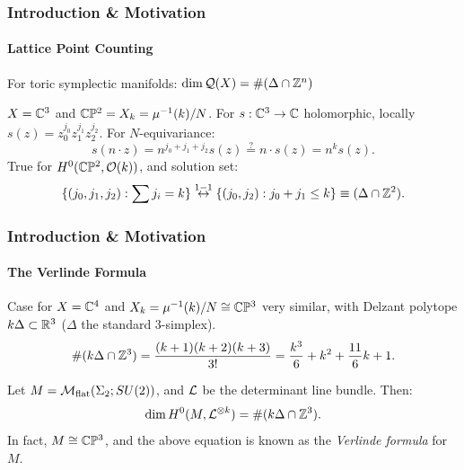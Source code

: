 \begin{frame}
	\frametitle{Introduction \& Motivation}
	\framesubtitle{Lattice Point Counting}
	
	\begin{thm}
	For toric symplectic manifolds:
	$
		\dim \mathcal{Q}(X) = \#(\Delta \cap \mathbb{Z}^{n})
	$
	\end{thm}

	\begin{ex}
		$X = \mathbb{C}^{3}$ and $\mathbb{C}\mathbb{P}^{2} = X_{k} = \mu^{-1}(k)/N$. For $s:\mathbb{C}^{3} \rightarrow \mathbb{C}$ holomorphic, locally $s(z) = z_{0}^{j_{0}}z_{1}^{j_{1}}z_{2}^{j_{2}}$. For $N$-equivariance:
		\vspace{-10pt}
		$$
			s(n\cdot z) = n^{j_{0} + j_{1} + j_{2}}s(z) \overset{?}{=} n\cdot s(z) = n^{k}s(z).
		$$
		True for $H^{0}(\mathbb{C}\mathbb{P}^{2},\mathcal{O}(k))$, and solution set:
		$$
			\{(j_{0}, j_{1}, j_{2}) : \sum j_{i} = k  \} \overset{1-1}{\leftrightarrow} \{(j_{0}, j_{2}): j_{0} + j_{1} \leq k  \} \equiv (\Delta \cap \mathbb{Z}^{2}).
		$$
	\end{ex}

\end{frame}

\begin{frame}
		\frametitle{Introduction \& Motivation}
		\framesubtitle{The Verlinde Formula}
		
	\begin{rmk}
		Case for $X = \mathbb{C}^{4}$ and $X_{k} = \mu^{-1}(k)/N \cong \mathbb{C}\mathbb{P}^{3}$ very similar, with Delzant polytope $k\Delta \subset \mathbb{R}^{3}$ ($\Delta$ the standard $3$-simplex).
		$$
		\#(k\Delta \cap \mathbb{Z}^{3}) = \frac{(k+1)(k+2)(k+3)}{3!} = \frac{k^{3}}{6} + k^{2} + \frac{11}{6}k + 1.
		$$
	\end{rmk}

	\begin{fact}
		Let $M = \mathcal{M}_{\text{flat}}(\Sigma_{2};SU(2))$, and $\mathcal{L}$ be the determinant line bundle. Then:
		$$
			\dim H^{0}(M,\mathcal{L}^{\otimes k}) = \#(k\Delta \cap \mathbb{Z}^{3}).
		$$
		In fact, $M \cong \mathbb{C}\mathbb{P}^{3}$, and the above equation is known as the \emph{Verlinde formula} for $M$.
	\end{fact}	

\end{frame}

